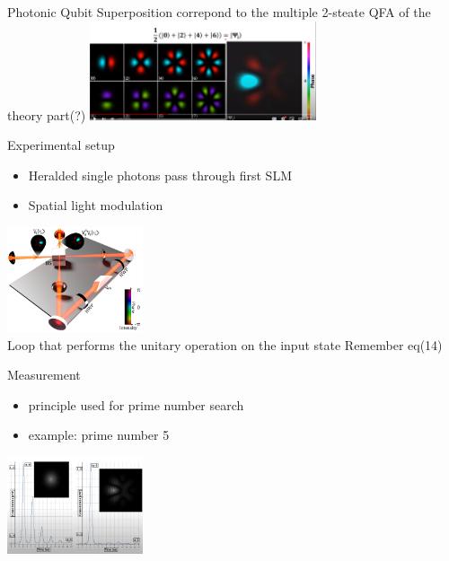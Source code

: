\documentclass[aspectratio=169,9pt]{beamer}
\begin{document}
\begin{frame}[t]{Photonic Qubit}
  Superposition correpond to the multiple 2-steate QFA of the theory part(?)
  \includegraphics[width=0.5\textwidth]{4photon_qubit_superposition.png}
\end{frame}


\begin{frame}[t]{Experimental setup}
  \begin{itemize}
    \item Heralded single photons pass through first SLM
    \item Spatial light modulation
  \end{itemize}
  \includegraphics[width=0.3\textwidth]{experimental_setup.png}\\
  Loop that performs the unitary operation on the input state
  Remember eq(14)
\end{frame}


\begin{frame}[t]{Measurement}
  \begin{itemize}
    \item principle used for prime number search
    \item example: prime number 5
  \end{itemize}
  \includegraphics[width=0.3\textwidth]{example_measurement.png}
\end{frame}


\end{document}
